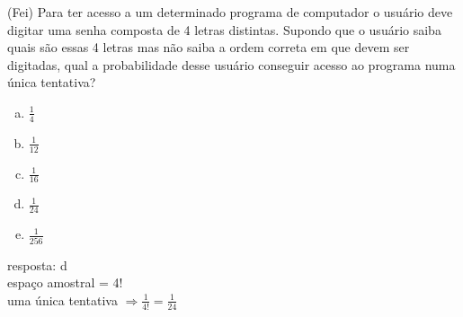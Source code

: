 \begin{ex}
 (Fei) Para ter acesso a um determinado programa de computador o usuário deve digitar uma senha composta de 4 letras distintas. Supondo que o usuário saiba quais são essas 4 letras mas não saiba a ordem correta em que devem ser digitadas, qual a probabilidade desse usuário conseguir acesso ao programa numa única tentativa?
    \begin{enumerate}[(a)]
    \item $\frac{1}{4}$
    \item $\frac{1}{12}$
    \item $\frac{1}{16}$
    \item $\frac{1}{24}$
    \item $\frac{1}{256}$
    \end{enumerate}
      \begin{sol}
        resposta: d \\
        espaço amostral = 4! \\
        uma única tentativa $\Longrightarrow \frac{1}{4!} = \frac{1}{24}$
      \end{sol}
\end{ex}